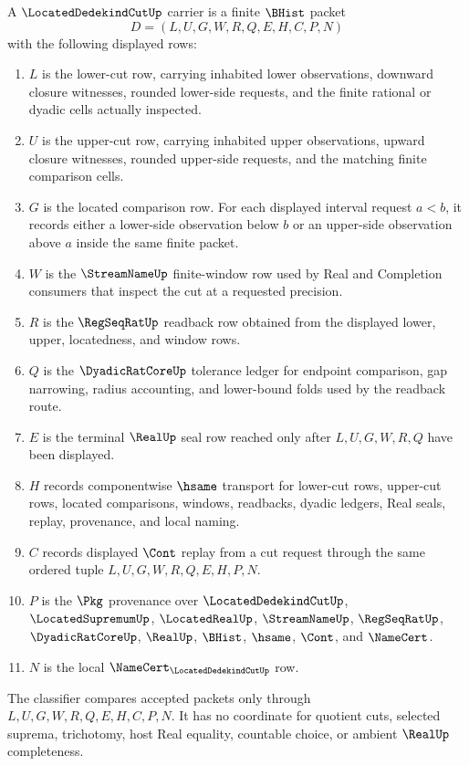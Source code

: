 \begin{definition}
\label{def:located-dedekind-cut-carrier}
A $\LocatedDedekindCutUp$ carrier is a finite $\BHist$ packet
$$
D=(L,U,G,W,R,Q,E,H,C,P,N)
$$
with the following displayed rows:
\begin{enumerate}
\item $L$ is the lower-cut row, carrying inhabited lower observations, downward closure witnesses, rounded lower-side requests, and the finite rational or dyadic cells actually inspected.
\item $U$ is the upper-cut row, carrying inhabited upper observations, upward closure witnesses, rounded upper-side requests, and the matching finite comparison cells.
\item $G$ is the located comparison row. For each displayed interval request $a<b$, it records either a lower-side observation below $b$ or an upper-side observation above $a$ inside the same finite packet.
\item $W$ is the $\StreamNameUp$ finite-window row used by Real and Completion consumers that inspect the cut at a requested precision.
\item $R$ is the $\RegSeqRatUp$ readback row obtained from the displayed lower, upper, locatedness, and window rows.
\item $Q$ is the $\DyadicRatCoreUp$ tolerance ledger for endpoint comparison, gap narrowing, radius accounting, and lower-bound folds used by the readback route.
\item $E$ is the terminal $\RealUp$ seal row reached only after $L,U,G,W,R,Q$ have been displayed.
\item $H$ records componentwise $\hsame$ transport for lower-cut rows, upper-cut rows, located comparisons, windows, readbacks, dyadic ledgers, Real seals, replay, provenance, and local naming.
\item $C$ records displayed $\Cont$ replay from a cut request through the same ordered tuple $L,U,G,W,R,Q,E,H,P,N$.
\item $P$ is the $\Pkg$ provenance over $\LocatedDedekindCutUp$, $\LocatedSupremumUp$, $\LocatedRealUp$, $\StreamNameUp$, $\RegSeqRatUp$, $\DyadicRatCoreUp$, $\RealUp$, $\BHist$, $\hsame$, $\Cont$, and $\NameCert$.
\item $N$ is the local $\NameCert_{\LocatedDedekindCutUp}$ row.
\end{enumerate}
The classifier compares accepted packets only through $L,U,G,W,R,Q,E,H,C,P,N$. It has no coordinate for quotient cuts, selected suprema, trichotomy, host Real equality, countable choice, or ambient $\RealUp$ completeness.
\end{definition}

